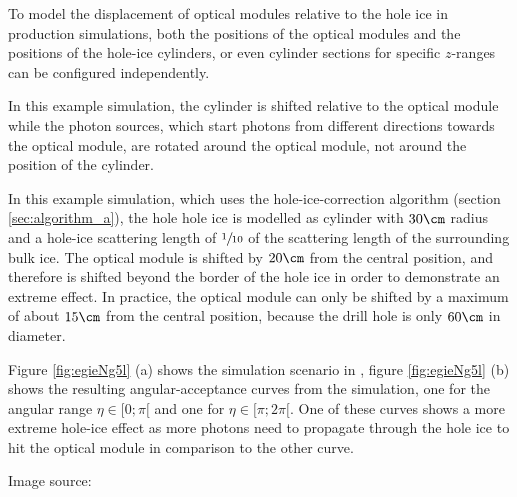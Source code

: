 To model the displacement of optical modules relative to the hole ice in production simulations, both the positions of the optical modules and the positions of the hole-ice cylinders, or even cylinder sections for specific $z$-ranges can be configured independently.

In this example simulation, the cylinder is shifted relative to the optical module while the photon sources, which start photons from different directions towards the optical module, are rotated around the optical module, not around the position of the cylinder.


In this example simulation, which uses the hole-ice-correction algorithm (section \ref{sec:algorithm_a}), the hole hole ice is modelled as cylinder with $30\cm$ radius and a hole-ice scattering length of $\sfrac{1}{10}$ of the scattering length of the surrounding bulk ice. The optical module is shifted by $20\cm$ from the central position, and therefore is shifted beyond the border of the hole ice in order to demonstrate an extreme effect. In practice, the optical module can only be shifted by a maximum of about $15\cm$ from the central position, because the drill hole is only $60\cm$ in diameter.

Figure \ref{fig:egieNg5l} (a) shows the simulation scenario in \steamshovel, figure \ref{fig:egieNg5l} (b) shows the resulting angular-acceptance curves from the simulation, one for the angular range $\eta \in [0;\pi[$ and one for $\eta \in [\pi; 2\pi[$. One of these curves shows a more extreme hole-ice effect as more photons need to propagate through the hole ice to hit the optical module in comparison to the other curve.

Image source: \cite{icrc17pocam}

